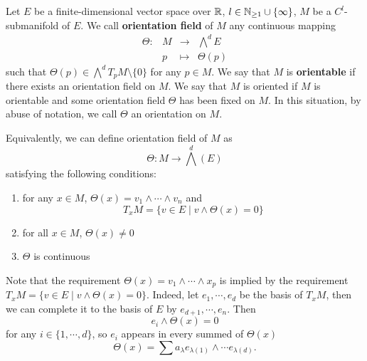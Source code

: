 \begin{definitionenv}
    Let $E$ be a finite-dimensional vector space over $\mathbb{R}$, $l \in \mathbb{N}_{\ge 1} \cup \{\infty\}$, $M$ be a $C^l$-submanifold of $E$.
    We call \textbf{orientation field} of $M$ any continuous mapping
    $$\begin{array}{rrcl}
        \Theta : & M & \longrightarrow & \bigwedge^d E\\
        & p & \longmapsto & \Theta(p)
    \end{array}$$
    such that $\Theta(p) \in \bigwedge^d T_pM\setminus \{0\}$ for any $p \in M$.
    We say that $M$ is \textbf{orientable} if there exists an orientation field on $M$.
    We say that $M$ is oriented if $M$ is orientable and some orientation field $\Theta$ has been fixed on $M$.
    In this situation, by abuse of notation, we call $\Theta$ an orientation on $M$.
\end{definitionenv}

\begin{remark}
    Equivalently, we can define orientation field of $M$ as
    $$\Theta : M \longrightarrow \bigwedge^d (E)$$
    satisfying the following conditions:
    \begin{enumerate}
        \item for any $x \in M$, $\Theta(x) = v_1 \wedge \cdots \wedge v_n$ and $$T_x M = \{v \in E \mid v \wedge \Theta(x) = 0\}$$
        \item for all $x \in M$, $\Theta(x) \neq 0$
        \item $\Theta$ is continuous
    \end{enumerate}
    Note that the requirement $\Theta(x) = v_1 \wedge \cdots \wedge x_p$ is implied by the requirement $T_xM = \{v \in E \mid v \wedge \Theta(x) = 0\}$.
    Indeed, let $e_1,\cdots,e_d$ be the basis of $T_xM$, then we can complete it to the basis of $E$ by $e_{d+1},\cdots,e_{n}$.
    Then
    $$e_i \wedge \Theta(x) = 0$$
    for any $i \in \{1,\cdots,d\}$, so $e_i$ appears in every summed of $\Theta(x)$
    $$\Theta(x) = \sum a_{\lambda} e_{\lambda(1)} \wedge \cdots e_{\lambda(d)}.$$
\end{remark}

